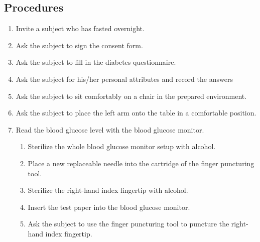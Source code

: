 \documentclass{article}
\begin{document}
\subsection{Procedures}
\begin{enumerate}
\item Invite a subject who has fasted overnight.
\item Ask the subject to sign the consent form.
\item Ask the subject to fill in the diabetes questionnaire.
\item Ask the subject for his/her personal attributes and record the answers
\item Ask the subject to sit comfortably on a chair in the prepared environment.
\item Ask the subject to place the left arm onto the table in a comfortable position.
\item Read the blood glucose level with the blood glucose monitor.
    \begin{enumerate}
    \item Sterilize the whole blood glucose monitor setup with alcohol.
    \item Place a new replaceable needle into the cartridge of the finger puncturing tool.
    \item Sterilize the right-hand index fingertip with alcohol.
    \item Insert the test paper into the blood glucose monitor.
    \item Ask the subject to use the finger puncturing tool to puncture the right-hand index fingertip.



\end{enumerate}
\end{enumerate}
\end{document}
